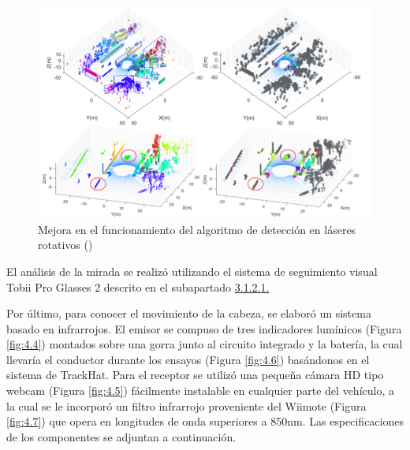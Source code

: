\begin{figure}[h]
    \centering
    \includegraphics[width=12.5cm]
    {figures/4.3.png}
    \caption{ \label{fig:4.3} Mejora en el funcionamiento del algoritmo de detección en láseres rotativos (\cite{clavijo})}
\end{figure}

El análisis de la mirada se realizó utilizando el sistema de seguimiento visual Tobii Pro Glasses 2 descrito en el subapartado \hyperref[3121]{3.1.2.1.}

Por último, para conocer el movimiento de la cabeza, se elaboró un sistema basado en infrarrojos. El emisor se compuso de tres indicadores lumínicos (Figura \ref{fig:4.4}) montados sobre una gorra junto al circuito integrado y la batería, la cual llevaría el conductor durante los ensayos (Figura \ref{fig:4.6}) basándonos en el sistema de TrackHat. Para el receptor se utilizó una pequeña cámara HD tipo webcam (Figura \ref{fig:4.5}) fácilmente instalable en cualquier parte del vehículo, a la cual se le incorporó un filtro infrarrojo proveniente del Wiimote (Figura \ref{fig:4.7}) que opera en longitudes de onda superiores a 850nm. Las especificaciones de los componentes se adjuntan a continuación.


